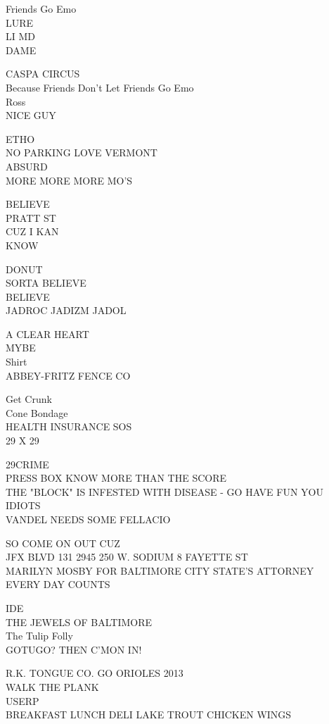 \documentclass[10pt,letterpaper]{article}
\begin{document}
Friends Go Emo\\
LURE\\
LI MD\\
DAME

CASPA CIRCUS\\
Because Friends Don't Let Friends Go Emo\\
Ross\\
NICE GUY

ETHO\\
NO PARKING LOVE VERMONT\\
ABSURD\\
MORE MORE MORE MO'S

BELIEVE\\
PRATT ST\\
CUZ I KAN\\
KNOW

DONUT\\
SORTA BELIEVE\\
BELIEVE\\
JADROC JADIZM JADOL

A CLEAR HEART\\
MYBE\\
Shirt\\
ABBEY{-}FRITZ FENCE CO

Get Crunk\\
Cone Bondage\\
HEALTH INSURANCE SOS\\
29 X 29

29CRIME\\
PRESS BOX KNOW MORE THAN THE SCORE\\
THE "BLOCK" IS INFESTED WITH DISEASE {-} GO HAVE FUN YOU IDIOTS\\
VANDEL NEEDS SOME FELLACIO

SO COME ON OUT CUZ\\
JFX BLVD 131 2945 250 W. SODIUM 8 FAYETTE ST\\
MARILYN MOSBY FOR BALTIMORE CITY STATE'S ATTORNEY\\
EVERY DAY COUNTS

IDE\\
THE JEWELS OF BALTIMORE\\
The Tulip Folly\\
GOTUGO? THEN C'MON IN!

R.K. TONGUE CO. GO ORIOLES 2013\\
WALK THE PLANK\\
USERP\\
BREAKFAST LUNCH DELI LAKE TROUT CHICKEN WINGS
\end{document}
